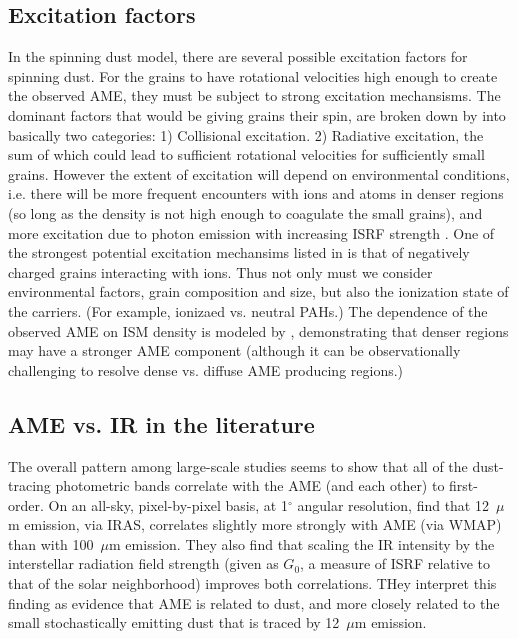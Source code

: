     \subsection{Excitation factors}
       In the spinning dust model, there are several possible excitation factors for spinning dust. For the grains to have rotational velocities high enough to create the observed AME, they must be subject to strong excitation mechansisms. The dominant factors that would be giving grains their spin, are broken down by \cite{draine11} into basically two categories: 1) Collisional excitation. 2) Radiative excitation, the sum of which could lead to sufficient rotational velocities for sufficiently small grains. However the extent of excitation will depend on environmental conditions, i.e. there will be more frequent encounters with ions and atoms in denser regions (so long as the density is not high enough to coagulate the small grains), and more excitation due to photon emission with increasing ISRF strength \citep{ali-haimoud09, ali-haimoud14}. One of the strongest potential excitation mechansims listed in \cite{draine11} is that of negatively charged grains interacting with ions. Thus not only must we consider environmental factors, grain composition and size, but also the ionization state of the carriers. (For example, ionizaed vs. neutral PAHs.) The dependence of the observed AME on ISM density is modeled by \cite{ali-haimoud10}, demonstrating that denser regions may have a stronger AME component (although it can be observationally challenging to resolve dense vs. diffuse AME producing regions.)

       \subsection{AME vs. IR in the literature}
        The overall pattern among large-scale studies seems to show that all of the dust-tracing photometric bands correlate with the AME (and each other) to first-order.  On an all-sky, pixel-by-pixel basis, at 1$^{\circ}$ angular resolution, \cite{ysard10b} find that 12~$\mu$m emission, via IRAS, correlates slightly more strongly with AME (via WMAP) than with 100~$\mu$m emission.  They also find that scaling the IR intensity by the interstellar radiation field strength (given as $G_0$, a measure of ISRF relative to that of the solar neighborhood) improves both correlations. THey interpret this finding as evidence that AME is related to dust, and more closely related to the small stochastically emitting dust that is traced by 12~$\mu$m emission.

